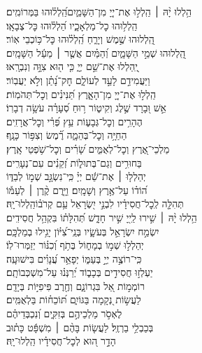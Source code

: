 \documentclass[twoside, openany, parskip=half, 11pt]{book}
\begin{document}
\begin{narrow}
הַ֥לְלוּ יָ֨הּ ׀ \hfill \break
הַֽלְל֣וּ אֶת־יְיָ֭ מִן־הַשָּׁמַ֑יִם\hfill הַֽ֝לְל֗וּהוּ בַּמְּרוֹמִֽים׃ \\
 הַֽלְל֥וּהוּ כׇל־מַלְאָכָ֑יו \hfill הַ֝לְל֗וּהוּ כׇּל־צְבָאָֽו׃ \\
 הַֽ֭לְלוּהוּ שֶׁ֣מֶשׁ וְיָרֵ֑חַ \hfill הַֽ֝לְל֗וּהוּ כׇּל־כּ֥וֹכְבֵי אֽוֹר׃ \\
 הַֽ֭לְלוּהוּ שְׁמֵ֣י הַשָּׁמָ֑יִם \hfill וְ֝הַמַּ֗יִם אֲשֶׁ֤ר ׀ מֵעַ֬ל הַשָּׁמָֽיִם׃ \\
 יְֽ֭הַלְלוּ אֶת־שֵׁ֣ם יְיָ֑ \hfill כִּ֤י ה֖וּא צִוָּ֣ה וְנִבְרָֽאוּ׃ \\
 וַיַּעֲמִידֵ֣ם לָעַ֣ד לְעוֹלָ֑ם \hfill חׇק־נָ֝תַ֗ן וְלֹ֣א יַעֲבֽוֹר׃ \\
 הַֽלְל֣וּ אֶת־יְיָ֭ מִן־הָאָ֑רֶץ \hfill תַּ֝נִּינִ֗ים וְכׇל־תְּהֹמֽוֹת׃ \\
 אֵ֣שׁ וּ֭בָרָד שֶׁ֣לֶג וְקִיט֑וֹר \hfill ר֥וּחַ סְ֝עָרָ֗ה עֹשָׂ֥ה דְבָרֽוֹ׃ \\
 הֶהָרִ֥ים וְכׇל־גְּבָע֑וֹת \hfill עֵ֥ץ פְּ֝רִ֗י וְכׇל־אֲרָזִֽים׃ \\
 הַחַיָּ֥ה וְכׇל־בְּהֵמָ֑ה \hfill רֶ֗֝מֶשׂ וְצִפּ֥וֹר כָּנָֽף׃ \\
 מַלְכֵי־אֶ֭רֶץ וְכׇל־לְאֻמִּ֑ים \hfill שָׂ֝רִ֗ים וְכׇל־שֹׁ֥פְטֵי אָֽרֶץ׃ \\
 בַּחוּרִ֥ים וְגַם־בְּתוּל֑וֹת \hfill זְ֝קֵנִ֗ים עִם־נְעָרִֽים׃ \\
 יְהַלְל֤וּ ׀ אֶת־שֵׁ֬ם יְיָ֗  \hfill כִּֽי־נִשְׂגָּ֣ב שְׁמ֣וֹ לְבַדּ֑וֹ\\ ה֝וֹד֗וֹ עַל־אֶ֥רֶץ וְשָׁמָֽיִם׃ \hfill
 וַיָּ֤רֶם קֶ֨רֶן ׀ לְעַמּ֡וֹ\\ תְּהִלָּ֤ה לְֽכׇל־חֲסִידָ֗יו לִבְנֵ֣י יִ֭שְׂרָאֵל עַ֥ם קְרֹב֗וֹ\hfill הַֽלְלוּ־יָֽהּ׃ \\

הַ֥לְלוּ יָ֨הּ ׀ \hfill \break
 שִׁ֣ירוּ לַֽייָ֭ שִׁ֣יר חָדָ֑שׁ \hfill תְּ֝הִלָּת֗וֹ בִּקְהַ֥ל חֲסִידִֽים׃ \\
 יִשְׂמַ֣ח יִשְׂרָאֵ֣ל בְּעֹשָׂ֑יו \hfill בְּנֵֽי־צִ֝יּ֗וֹן יָגִ֥ילוּ בְמַלְכָּֽם׃ \\
 יְהַלְל֣וּ שְׁמ֣וֹ בְמָח֑וֹל \hfill בְּתֹ֥ף וְ֝כִנּ֗וֹר יְזַמְּרוּ־לֽוֹ׃ \\
 כִּֽי־רוֹצֶ֣ה יְיָ֣ בְּעַמּ֑וֹ \hfill יְפָאֵ֥ר עֲ֝נָוִ֗ים בִּישׁוּעָֽה׃ \\
 יַעְלְז֣וּ חֲסִידִ֣ים בְּכָב֑וֹד \hfill יְ֝רַנְּנ֗וּ עַל־מִשְׁכְּבוֹתָֽם׃ \\
 רוֹמְמ֣וֹת אֵ֭ל בִּגְרוֹנָ֑ם \hfill וְחֶ֖רֶב פִּיפִיּ֣וֹת בְּיָדָֽם׃ \\
 לַעֲשׂ֣וֹת נְ֭קָמָה בַּגּוֹיִ֑ם \hfill תּ֝וֹכֵח֗וֹת בַּלְאֻמִּֽים׃ \\
 לֶאְסֹ֣ר מַלְכֵיהֶ֣ם בְּזִקִּ֑ים \hfill וְ֝נִכְבְּדֵיהֶ֗ם\\ בְּכַבְלֵ֥י בַרְזֶֽל׃ \hfill
 לַעֲשׂ֤וֹת בָּהֶ֨ם ׀ מִשְׁפָּ֬ט כָּת֗וּב\\ הָדָ֣ר ה֭וּא לְכׇל־חֲסִידָ֗יו \hfill הַֽלְלוּ־יָֽהּ׃ \\
 

\end{narrow}
\end{document}
